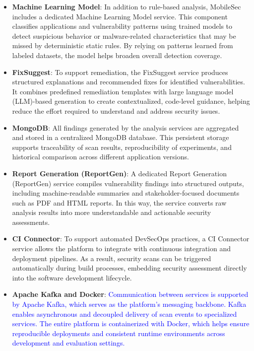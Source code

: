 \documentclass[preprint,12pt, a4paper]{elsarticle}
\begin{document}
\begin{itemize}
    \item \textbf{Machine Learning Model}: In addition to rule-based analysis, MobileSec includes a dedicated Machine Learning Model service. This component classifies applications and vulnerability patterns using trained models to detect suspicious behavior or malware-related characteristics that may be missed by deterministic static rules. By relying on patterns learned from labeled datasets, the model helps broaden overall detection coverage.

    \item \textbf{FixSuggest}: To support remediation, the FixSuggest service produces structured explanations and recommended fixes for identified vulnerabilities. It combines predefined remediation templates with large language model (LLM)-based generation to create contextualized, code-level guidance, helping reduce the effort required to understand and address security issues.

    \item \textbf{MongoDB}: All findings generated by the analysis services are aggregated and stored in a centralized MongoDB database. This persistent storage supports traceability of scan results, reproducibility of experiments, and historical comparison across different application versions.

    \item \textbf{Report Generation (ReportGen)}: A dedicated Report Generation (ReportGen) service compiles vulnerability findings into structured outputs, including machine-readable summaries and stakeholder-focused documents such as PDF and HTML reports. In this way, the service converts raw analysis results into more understandable and actionable security assessments.

    \item \textbf{CI Connector}: To support automated DevSecOps practices, a CI Connector service allows the platform to integrate with continuous integration and deployment pipelines. As a result, security scans can be triggered automatically during build processes, embedding security assessment directly into the software development lifecycle.

    \item \textbf{Apache Kafka and Docker}: \textcolor{blue}{Communication between services is supported by Apache Kafka, which serves as the platform's messaging backbone. Kafka enables asynchronous and decoupled delivery of scan events to specialized services. The entire platform is containerized with Docker, which helps ensure reproducible deployments and consistent runtime environments across development and evaluation settings.}
\end{itemize}
\end{document}
